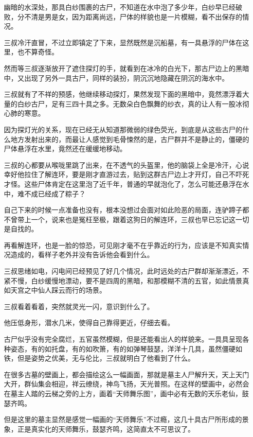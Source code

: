 幽暗的水深处，那具白纱围裹的古尸，不知道在水中泡了多少年，白纱早已经破败，分不清是男是女，因为距离尚远，尸体的样貌也是一片模糊，看不出保存的情况。

三叔冷汗直冒，不过立即镇定了下来，显然既然是沉船墓，有一具悬浮的尸体在这里，也不算奇怪。

然而等三叔逐渐放开了遮住探灯的手，就看到在冰冷的白光下，那古尸边上的黑暗中，又出现了另外一具古尸，同样的装扮，阴沉沉地隐藏在阴沉的海水中。

三叔就有了不祥的预感，他继续移动探灯，果然发现下面的黑暗中，竟然漂浮着大量的白纱古尸，足有三四十具之多。无数朵白色飘舞的纱衣，真的让人有一股冰彻心肺的寒意。

因为探灯光的关系，现在已经无从知道那微弱的绿色荧光，到底是从这些古尸的什么地方发射出来的，而最让人感觉到毛骨悚然的是，古尸群并不是静止的，僵硬的尸体悬浮在水里，竟然还在缓缓地移动。

三叔的心都要从喉咙里跳了出来，在不透气的头盔里，他的脑袋上全是冷汗，心说幸好他拉住了解连环，要是刚才直游过去，贴到这群古尸边上才开灯，自己不吓死才怪。这些尸体肯定在这里泡了近千年，普通的早就泡化了，怎么可能还悬浮在水中，难不成已经成了粽子？

自己下来的时候一点准备也没有，根本没想过会面对如此险恶的局面，连驴蹄子都不曾带上一个，说来也是冤枉至极，跟着这狗日的解连环，三叔也早已忘记这一切是自找的。

再看解连环，也是一脸的惊恐，可见刚才毫不在乎靠近的行为，应该是不知真实情况造成的，看样子老外并没有告诉他会看到什么。

三叔思绪如电，闪电间已经预见了好几个情况，此时远处的古尸群却渐渐漂近，不紧不慢，白纱缓慢地漂动，要不是四周的黑暗，和那模糊不清的五官，如此情景真如天宫之中仙人踩云而行的场景。

三叔看着看着，突然就灵光一闪，意识到什么了。

他压低身形，潜水几米，使得自己靠得更近，仔细去看。

古尸似乎没有完全腐烂，五官虽然模糊，但是还能看出人的样貌来。一具具呈现各种姿态，有的如托盘，有的如吹箫，有的如弹琴鼓瑟，洋洋十几具，虽然僵硬如铁，但是姿势之优美，无与伦比，三叔就明白了他看到了什么。

在很多古墓的壁画上，都会描绘这么一幅画面，那就是墓主人尸解升天，天上天门大开，群仙集会相迎，祥云缭绕，神鸟飞扬，天光普照。在这样的壁画中，必然会在墓主人踏的云梯之旁的上方，画着“天师舞乐图”，画中必有无数的天乐老仙，鼓瑟齐鸣。

但是这里的墓主显然是感觉一幅画的“天师舞乐”不过瘾，这几十具古尸所形成的景象，正是真实化的天师舞乐，鼓瑟齐鸣，这简直太不可思议了。

